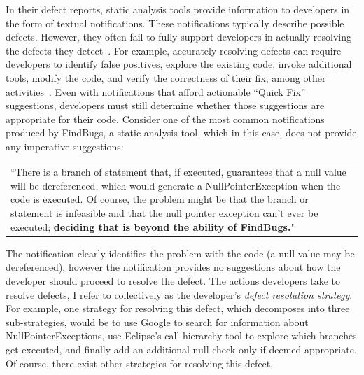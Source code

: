 \documentclass{sig-alternate}
\begin{document}
In their defect reports, static analysis tools provide information to developers in the form of textual notifications.
These notifications typically describe possible defects.
However, they often fail to fully support developers in actually resolving the defects they detect~\cite{Johnson2013}.
For example, accurately resolving defects can require developers to identify false positives, explore the existing code, invoke additional tools, modify the code, and verify the correctness of their fix, among other activities~\cite{Smith2015}.  
Even with notifications that afford actionable ``Quick Fix'' suggestions, developers must still determine whether those suggestions are appropriate for their code.
Consider one of the most common \cite{Ayewah2007} notifications produced by FindBugs, a static analysis tool, which in this case, does not provide any imperative suggestions:


\vspace{2mm}

\begin{tabular}{|p{7.5cm}}
	``There is a branch of statement that, if executed, guarantees that a null value will be dereferenced, which would generate a NullPointerException when the code is executed. Of course, the problem might be that the branch or statement is infeasible and that the null pointer exception can't ever be executed; \textbf{deciding that is beyond the ability of FindBugs.}"\\
\end{tabular}
\vspace{2mm}

\noindent
The notification clearly identifies the problem with the code (a null value may be dereferenced), however the notification provides no suggestions about how the developer should proceed to resolve the defect. 
The actions developers take to resolve defects, I refer to collectively as the developer's \textit{defect resolution strategy}.
For example, one strategy for resolving this defect, which decomposes into three sub-strategies, would be to use Google to search for information about NullPointerExceptions, use Eclipse's call hierarchy tool to explore which branches get executed, and finally add an additional null check only if deemed appropriate.
Of course, there exist other strategies for resolving this defect.
\end{document}
